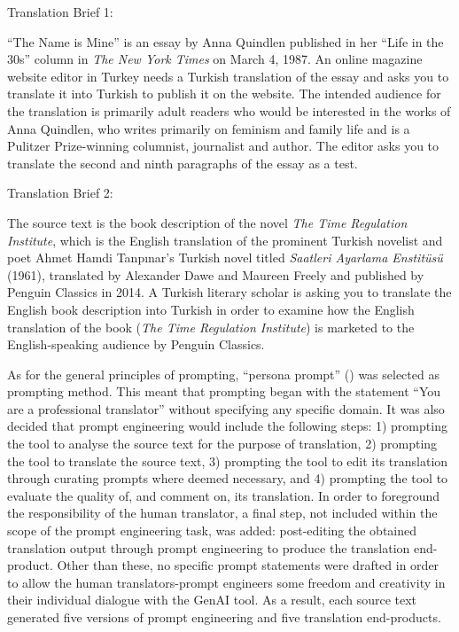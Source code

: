 \documentclass[output=paper,colorlinks,citecolor=brown]{langscibook}
\begin{document}
\ea
Translation Brief 1:

“The Name is Mine” is an essay by Anna Quindlen published in her “Life in the 30s” column in \textit{The New York Times} on March 4, 1987. An online magazine website editor in Turkey needs a Turkish translation of the essay and asks you to translate it into Turkish to publish it on the website. The intended audience for the translation is primarily adult readers who would be interested in the works of Anna Quindlen, who writes primarily on feminism and family life and is a Pulitzer Prize-winning columnist, journalist and author. The editor asks you to translate the second and ninth paragraphs of the essay as a test.
\z

\ea
Translation Brief 2:

The source text is the book description of the novel \textit{The Time Regulation Institute}, which is the English translation of the prominent Turkish novelist and poet Ahmet Hamdi Tanpınar’s Turkish novel titled \textit{Saatleri Ayarlama Enstitüsü} (1961), translated by Alexander Dawe and Maureen Freely and published by Penguin Classics in 2014. A Turkish literary scholar is asking you to translate the English book description into Turkish in order to examine how the English translation of the book (\textit{The Time Regulation Institute}) is marketed to the English-speaking audience by Penguin Classics.
\z

As for the general principles of prompting, “persona prompt” (\cite{he2024promptingchatgpttranslationcomparative}) was selected as prompting method. This meant that prompting began with the statement “You are a professional translator” without specifying any specific domain. It was also decided that prompt engineering would include the following steps: 1) prompting the tool to analyse the source text for the purpose of translation, 2) prompting the tool to translate the source text, 3) prompting the tool to edit its translation through curating prompts where deemed necessary, and 4) prompting the tool to evaluate the quality of, and comment on, its translation. In order to foreground the responsibility of the human translator, a final step, not included within the scope of the prompt engineering task, was added: post-editing the obtained translation output through prompt engineering to produce the translation end-product. Other than these, no specific prompt statements were drafted in order to allow the human translators-prompt engineers some freedom and creativity in their individual dialogue with the GenAI tool. As a result, each source text generated five versions of prompt engineering and five translation end-products.
\end{document}
